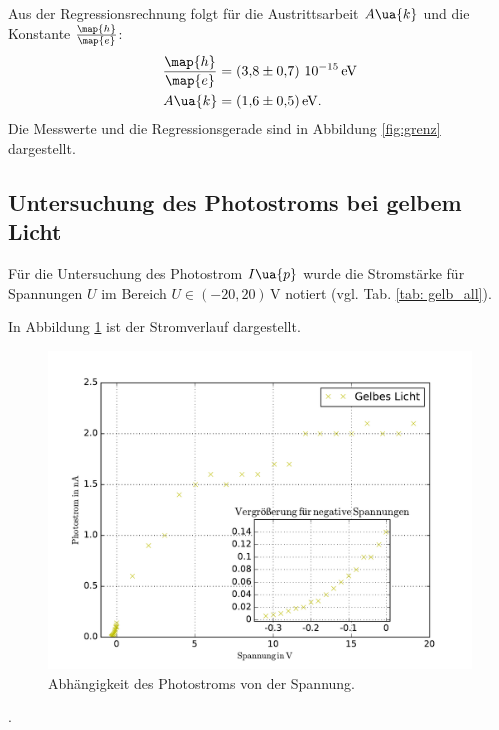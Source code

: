 Aus der Regressionsrechnung folgt für die Austrittsarbeit $A\ua{k}$ und die
Konstante $\frac{\map{h}}{\map{e}}$:
\begin{align}
  \label{eq:messergebnisse}
  \begin{aligned}
  \frac{\map{h}}{\map{e}}&= \left(\num{3.8\pm 0.7}\right)\,\num{e-15}\,\si{\eV} \\
  A\ua{k}&=\SI{1.6\pm 0.5}{\eV}.
  \end{aligned}
\end{align}
Die Messwerte und die Regressionsgerade sind in Abbildung \ref{fig:grenz} dargestellt.
\subsection{Untersuchung des Photostroms bei gelbem Licht}
Für die Untersuchung des Photostrom $I\ua{p}$ wurde die
Stromstärke für Spannungen $U$ im Bereich $U\in\left(-20,20\right)\,\si{\volt}$
notiert (vgl. Tab. \ref{tab: gelb_all}).

In Abbildung \ref{fig:gelb_all} ist der Stromverlauf dargestellt.
\begin{figure}
    \centering
    \includegraphics[width=1 \textwidth]{../Messdaten/gelb.pdf}
    \caption{Abhängigkeit des Photostroms von der Spannung.}
    \label{fig:gelb_all}
  \end{figure}.
